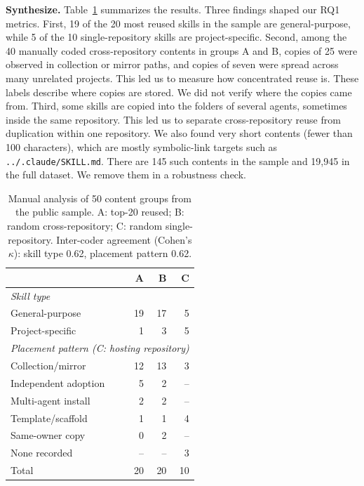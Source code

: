 \documentclass[sigconf,review]{acmart}
\begin{document}
\textbf{Synthesize.} Table~\ref{tab:manual} summarizes the results.
Three findings shaped our RQ1 metrics.
First, 19 of the 20 most reused skills in the sample are general-purpose, while 5 of the 10 single-repository skills are project-specific.
Second, among the 40 manually coded cross-repository contents in groups A and B, copies of 25 were observed in collection or mirror paths, and copies of seven were spread across many unrelated projects.
This led us to measure how concentrated reuse is.
These labels describe where copies are stored. We did not verify where the copies came from.
Third, some skills are copied into the folders of several agents, sometimes inside the same repository.
This led us to separate cross-repository reuse from duplication within one repository.
We also found very short contents (fewer than 100 characters), which are mostly symbolic-link targets such as \texttt{../.claude/SKILL.md}.
There are 145 such contents in the sample and 19{,}945 in the full dataset.
We remove them in a robustness check.
 
\begin{table}[t]
  \caption{Manual analysis of 50 content groups from the public sample. A: top-20 reused; B: random cross-repository; C: random single-repository. Inter-coder agreement (Cohen's $\kappa$): skill type 0.62, placement pattern 0.62.}
  \label{tab:manual}
  \centering
  \small
  \begin{tabular}{lrrr}
    \toprule
    & A & B & C \\
    \midrule
    \multicolumn{4}{l}{\textit{Skill type}} \\
    \quad General-purpose          & 19 & 17 & 5 \\
    \quad Project-specific         & 1  & 3  & 5 \\
    \midrule
    \multicolumn{4}{l}{\textit{Placement pattern (C: hosting repository)}} \\
    \quad Collection/mirror        & 12 & 13 & 3 \\
    \quad Independent adoption     & 5  & 2  & -- \\
    \quad Multi-agent install      & 2  & 2  & -- \\
    \quad Template/scaffold        & 1  & 1  & 4 \\
    \quad Same-owner copy          & 0  & 2  & -- \\
    \quad None recorded            & -- & -- & 3 \\
    \midrule
    Total                          & 20 & 20 & 10 \\
    \bottomrule
  \end{tabular}
\end{table}
 
\end{document}
